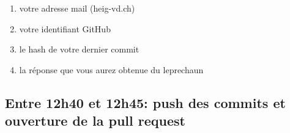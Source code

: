 \documentclass[a4paper, french, 10pt]{article} %
\begin{document}
\begin{enumerate}
\item votre adresse mail (heig-vd.ch)
\item votre identifiant GitHub
\item le hash de votre dernier commit
\item la réponse que vous aurez obtenue du leprechaun
\end{enumerate}

\subsection{Entre 12h40 et 12h45: push des commits et ouverture de la pull request}




\end{document}
